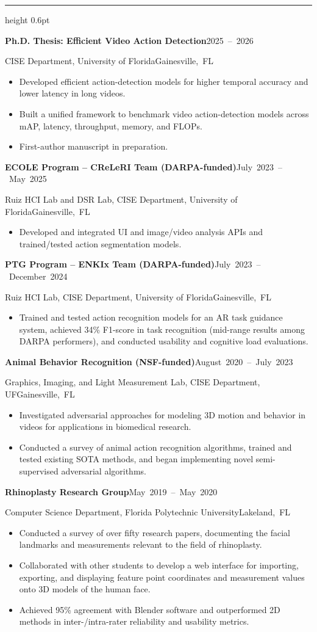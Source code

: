\documentclass[11pt,letterpaper]{article}
\newcommand{\cvsection}[1]{\par\addvspace{11pt}\Needspace{5\baselineskip}{\fontsize{12}{14}\selectfont\textbf{\MakeUppercase{#1}}}\par\nobreak\vspace{2pt}\hrule height 0.6pt\nobreak\vspace{5pt}}
\newcommand{\cvrow}[2]{\noindent #1\hfill\mbox{#2}\par}
\newcommand{\cvrole}[4]{\par\addvspace{5pt}\Needspace{4\baselineskip}\cvrow{\textbf{#1}}{#2}\cvrow{#3}{#4}}
\begin{document}
\cvsection{Research Experience}
\cvrole{Ph.D. Thesis: Efficient Video Action Detection}{2025 – 2026}{CISE Department, University of Florida}{Gainesville, FL}
\begin{itemize}
\item Developed efficient action-detection models for higher temporal accuracy and lower latency in long videos.
\item Built a unified framework to benchmark video action-detection models across mAP, latency, throughput, memory, and FLOPs.
\item First-author manuscript in preparation.
\end{itemize}
\cvrole{ECOLE Program – CReLeRI Team (DARPA-funded)}{July 2023 – May 2025}{Ruiz HCI Lab and DSR Lab, CISE Department, University of Florida}{Gainesville, FL}
\begin{itemize}
\item Developed and integrated UI and image/video analysis APIs and trained/tested action segmentation models.
\end{itemize}
\cvrole{PTG Program – ENKIx Team (DARPA-funded)}{July 2023 – December 2024}{Ruiz HCI Lab, CISE Department, University of Florida}{Gainesville, FL}
\begin{itemize}
\item Trained and tested action recognition models for an AR task guidance system, achieved 34\% F1-score in task recognition (mid-range results among DARPA performers), and conducted usability and cognitive load evaluations.
\end{itemize}
\cvrole{Animal Behavior Recognition (NSF-funded)}{August 2020 – July 2023}{Graphics, Imaging, and Light Measurement Lab, CISE Department, UF}{Gainesville, FL}
\begin{itemize}
\item Investigated adversarial approaches for modeling 3D motion and behavior in videos for applications in biomedical research.
\item Conducted a survey of animal action recognition algorithms, trained and tested existing SOTA methods, and began implementing novel semi-supervised adversarial algorithms.
\end{itemize}
\cvrole{Rhinoplasty Research Group}{May 2019 – May 2020}{Computer Science Department, Florida Polytechnic University}{Lakeland, FL}
\begin{itemize}
\item Conducted a survey of over fifty research papers, documenting the facial landmarks and measurements relevant to the field of rhinoplasty.
\item Collaborated with other students to develop a web interface for importing, exporting, and displaying feature point coordinates and measurement values onto 3D models of the human face.
\item Achieved 95\% agreement with Blender software and outperformed 2D methods in inter-/intra-rater reliability and usability metrics.
\end{itemize}
\end{document}
